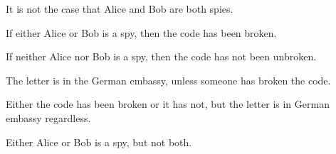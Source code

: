\problempart
\label{pr.spies}
\begin{earg}
\item It is not the case that Alice and Bob are both spies.
\item[] 
\item If either Alice or Bob is a spy, then the code has been broken.
\item[] 
\item If neither Alice nor Bob is a spy, then the code has not been unbroken.
\item[] 
\item The letter is in the German embassy, unless someone has broken the code.
\item[] 
\item Either the code has been broken or it has not, but the letter is in German embassy regardless.
\item[] 
\item Either Alice or Bob is a spy, but not both.
\item[] 
\end{earg}



